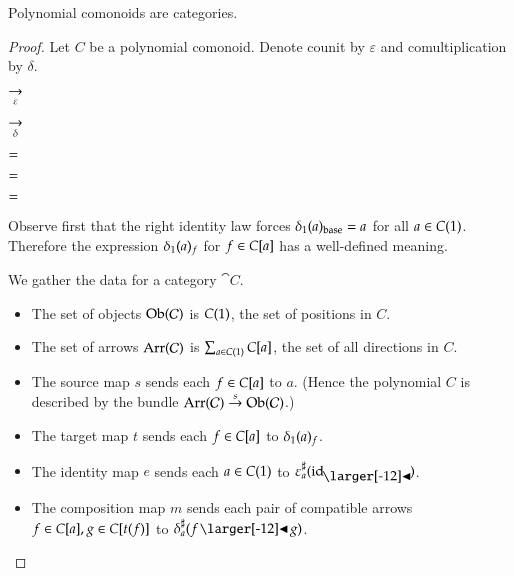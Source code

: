 \documentclass{amsart}
\begin{document}
\begin{prop}
  Polynomial comonoids are categories.
\end{prop}
\begin{proof}
  Let $C$ be a polynomial comonoid. Denote counit by $\varepsilon$
  and comultiplication by $\delta$.
  
  \begin{center}
    
    \hspace{-.75em}
    $\underset{\varepsilon}{\to}$
    
    \quad\qquad
    
    \hspace{-.75em}
    $\underset{\delta}{\to}$
    \hspace{.5em}
    
  \end{center}

  \begin{center}
    
    \quad
    $=$
    
    $=$
    \quad
    
  \end{center}

  \begin{center}
    
    \quad
    $=$
    \quad
    
  \end{center}

  Observe first that the right identity law forces ${\delta}_1(a)_{\mathrm{base}} = a$
  for all $a \in C(1)$.
  Therefore the expression ${\delta}_1(a)_f$ for $f \in C[a]$ has a
  well-defined meaning.

  We gather the data for a category $\cat{C}$.
  \begin{itemize}
  \item The set of objects $\operatorname{Ob}(\mathcal{C})$ is $C(1)$, the set
    of positions in $C$.
  \item The set of arrows $\operatorname{Arr}(\mathcal{C})$ is
    $\sum_{a \in C(1)}C[a]$, the set of all directions in $C$.
  \item The source map $s$ sends each $f \in C[a]$ to $a$. (Hence the
    polynomial $C$ is described by the bundle
    $\operatorname{Arr}(\mathcal{C}) \overset{s}{\to} \operatorname{Ob}(\mathcal{C})$.)
  \item The target map $t$ sends each $f \in C[a]$ to ${\delta}_1(a)_f$.
  \item The identity map $e$ sends each $a \in C(1)$ to
    $\dirmapof{\varepsilon}{a}{\idsubd}$.
  \item The composition map $m$ sends each pair of compatible
    arrows ${f \in C[a]}, {g \in C[t(f)]}$ to $\dirmapof{\delta}{a}{f \subd g}$.
  \end{itemize}


\end{proof}
\end{document}
